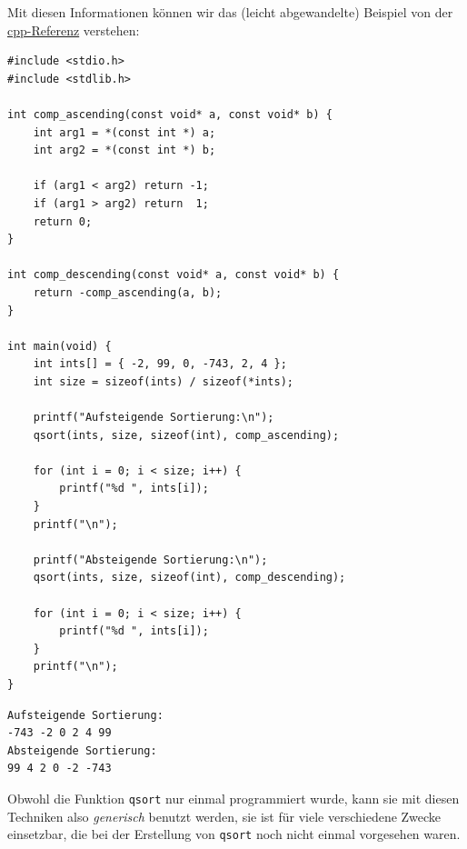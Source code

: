 Mit diesen Informationen können wir das (leicht abgewandelte) Beispiel von der \href{https://en.cppreference.com/w/c/algorithm/qsort}{cpp-Referenz} verstehen:

\begin{codebox}
\begin{verbatim}
#include <stdio.h>
#include <stdlib.h>

int comp_ascending(const void* a, const void* b) {
    int arg1 = *(const int *) a;
    int arg2 = *(const int *) b;

    if (arg1 < arg2) return -1;
    if (arg1 > arg2) return  1;
    return 0;
}

int comp_descending(const void* a, const void* b) {
    return -comp_ascending(a, b);
}

int main(void) {
    int ints[] = { -2, 99, 0, -743, 2, 4 };
    int size = sizeof(ints) / sizeof(*ints);

    printf("Aufsteigende Sortierung:\n");
    qsort(ints, size, sizeof(int), comp_ascending);

    for (int i = 0; i < size; i++) {
        printf("%d ", ints[i]);
    }
    printf("\n");

    printf("Absteigende Sortierung:\n");
    qsort(ints, size, sizeof(int), comp_descending);

    for (int i = 0; i < size; i++) {
        printf("%d ", ints[i]);
    }
    printf("\n");
}
\end{verbatim}
\end{codebox}

\begin{cmdbox}
\begin{verbatim}
Aufsteigende Sortierung:
-743 -2 0 2 4 99
Absteigende Sortierung:
99 4 2 0 -2 -743
\end{verbatim}
\end{cmdbox}

Obwohl die Funktion \texttt{qsort} nur einmal programmiert wurde, kann sie mit diesen Techniken also \emph{generisch} benutzt werden, \ie sie ist für viele verschiedene Zwecke einsetzbar, die bei der Erstellung von \texttt{qsort} noch nicht einmal vorgesehen waren.
